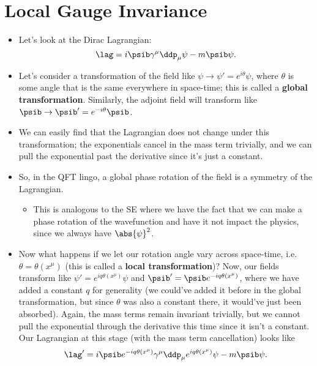 \section{Local Gauge Invariance}

\begin{itemize}
    \item Let's look at the Dirac Lagrangian:
        \begin{equation*}
            \lag = i\psib \gamma^{\mu}\ddp_{\mu} \psi - m\psib\psi.
        \end{equation*}
    \item Let's consider a transformation of the field like $\psi \rightarrow \psi' = e^{i\theta}\psi$, where $\theta$ is some angle that is the same everywhere in space-time; this is called a \textbf{global transformation}. Similarly, the adjoint field will transform like $\psib \rightarrow \psib' = e^{-i\theta}\psib$. 
    \item We can easily find that the Lagrangian does not change under this transformation; the exponentials cancel in the mass term trivially, and we can pull the exponential past the derivative since it's just a constant.
    \item So, in the QFT lingo, a global phase rotation of the field is a symmetry of the Lagrangian.
        \begin{itemize}
            \item This is analogous to the SE where we have the fact that we can make a phase rotation of the wavefunction and have it not impact the physics, since we always have $\abs{\psi}^2$.
        \end{itemize}
    \item Now what happens if we let our rotation angle vary across space-time, i.e. $\theta = \theta(x^{\mu})$ (this is called a \textbf{local transformation})? Now, our fields transform like $\psi' = e^{iq\theta(x^{\mu})}\psi$ and $\psib' = \psib e^{-iq\theta(x^{\mu})}$, where we have added a constant $q$ for generality (we could've added it before in the global transformation, but since $\theta$ was also a constant there, it would've just been absorbed). Again, the mass terms remain invariant trivially, but we cannot pull the exponential through the derivative this time since it isn't a constant. Our Lagrangian at this stage (with the mass term cancellation) looks like
        \begin{equation*}
            \lag' = i\psib e^{-iq\theta(x^{\mu})} \gamma^{\mu}\ddp_{\mu} e^{iq\theta(x^{\mu})}\psi - m\psib\psi.

\end{equation*}
\end{itemize}
